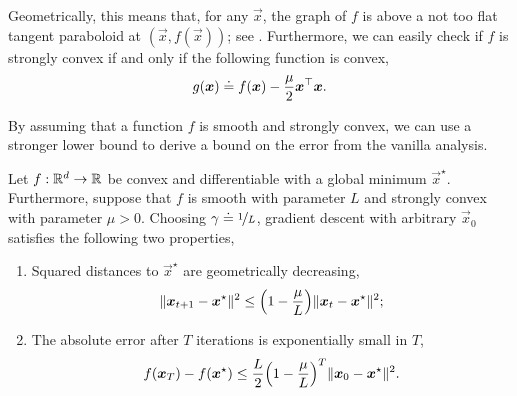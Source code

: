 Geometrically, this means that, for any $\vec{x}$, the graph of $f$ is above a not too flat tangent
paraboloid at $(\vec{x},f(\vec{x}))$; see . Furthermore, we can easily
check if $f$ is strongly convex if and only if the following function is convex, \[
    g(\bm{x}) \doteq f(\bm{x}) - \frac{\mu}{2}\bm{x}^\top\bm{x}.
\]

By assuming that a function $f$ is smooth and strongly convex, we can use a stronger lower bound to
derive a bound on the error from the vanilla analysis.

\begin{theorem}
    Let $f: \mathbb{R}^d \to \mathbb{R}$ be convex and differentiable with a global minimum $\vec{x}^\star$.
    Furthermore, suppose that $f$ is smooth with parameter $L$ and strongly convex with parameter
    $\mu > 0$. Choosing $\gamma \doteq \nicefrac{1}{L}$, gradient descent with arbitrary $\vec{x}_0$
    satisfies the following two properties,
    \begin{enumerate}
        \item Squared distances to $\vec{x}^\star$ are geometrically decreasing, \[
                  \|\vec{x}_{t+1} - \vec{x}^\star\|^2 \leq \lft( 1-\frac{\mu}{L} \rgt) \|\vec{x}_t-\vec{x}^\star\|^2;
              \]
        \item The absolute error after $T$ iterations is exponentially small in $T$, \[
                  f(\vec{x}_T) - f(\vec{x}^\star) \leq \frac{L}{2} \lft( 1-\frac{\mu}{L} \rgt)^T \|\vec{x}_0 - \vec{x}^\star\|^2.
              \]
    \end{enumerate}
\end{theorem}

